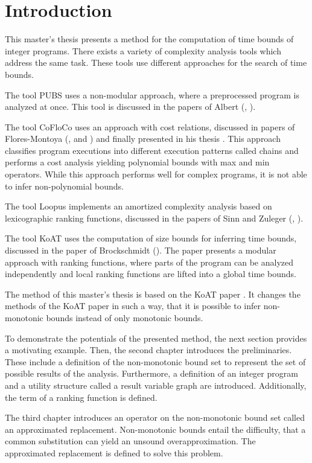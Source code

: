 \section{Introduction}

This master's thesis presents a method for the computation of time bounds of integer programs.
There exists a variety of complexity analysis tools which address the same task.
These tools use different approaches for the search of time bounds.

The tool PUBS uses a non-modular approach, where a preprocessed program is analyzed at once.
This tool is discussed in the papers of Albert (\cite{pubs1}, \cite{pubs2}).

The tool CoFloCo uses an approach with cost relations, discussed in papers of Flores-Montoya (\cite{cofloco1}, \cite{cofloco2} and \cite{cofloco4}) and finally presented in his thesis \cite{cofloco3}.
This approach classifies program executions into different execution patterns called chains and performs a cost analysis yielding polynomial bounds with max and min operators. 
While this approach performs well for complex programs, it is not able to infer non-polynomial bounds.

The tool Loopus implements an amortized complexity analysis based on lexicographic ranking functions, discussed in the papers of Sinn and Zuleger (\cite{loopus1}, \cite{loopus2}).

The tool KoAT uses the computation of size bounds for inferring time bounds, discussed in the paper of Brockschmidt (\cite{koat}).
The paper presents a modular approach with ranking functions, where parts of the program can be analyzed independently and local ranking functions are lifted into a global time bounds.

The method of this master's thesis is based on the KoAT paper \cite{koat}.
It changes the methods of the KoAT paper \cite{koat} in such a way, that it is possible to infer non-monotonic bounds instead of only monotonic bounds.

To demonstrate the potentials of the presented method, the next section provides a motivating example.
Then, the second chapter introduces the preliminaries.
These include a definition of the non-monotonic bound set to represent the set of possible results of the analysis.
Furthermore, a definition of an integer program and a utility structure called a result variable graph are introduced.
Additionally, the term of a ranking function is defined.

The third chapter introduces an operator on the non-monotonic bound set called an approximated replacement.
Non-monotonic bounds entail the difficulty, that a common substitution can yield an unsound overapproximation.
The approximated replacement is defined to solve this problem.


